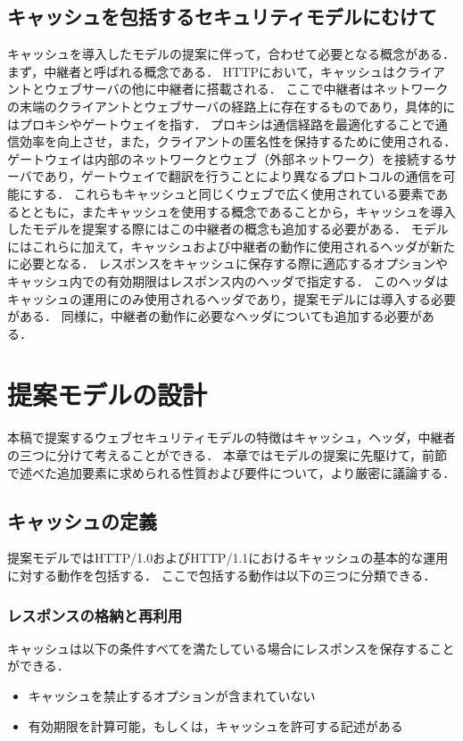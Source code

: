\documentclass{css}
\begin{document}
\subsection{キャッシュを包括するセキュリティモデルにむけて}
キャッシュを導入したモデルの提案に伴って，合わせて必要となる概念がある．
まず，中継者と呼ばれる概念である．
HTTPにおいて，キャッシュはクライアントとウェブサーバの他に中継者に搭載される．
ここで中継者はネットワークの末端のクライアントとウェブサーバの経路上に存在するものであり，具体的にはプロキシやゲートウェイを指す．
プロキシは通信経路を最適化することで通信効率を向上させ，また，クライアントの匿名性を保持するために使用される．
ゲートウェイは内部のネットワークとウェブ（外部ネットワーク）を接続するサーバであり，ゲートウェイで翻訳を行うことにより異なるプロトコルの通信を可能にする．
これらもキャッシュと同じくウェブで広く使用されている要素であるとともに，またキャッシュを使用する概念であることから，キャッシュを導入したモデルを提案する際にはこの中継者の概念も追加する必要がある．
モデルにはこれらに加えて，キャッシュおよび中継者の動作に使用されるヘッダが新たに必要となる．
レスポンスをキャッシュに保存する際に適応するオプションやキャッシュ内での有効期限はレスポンス内のヘッダで指定する．
このヘッダはキャッシュの運用にのみ使用されるヘッダであり，提案モデルには導入する必要がある．
同様に，中継者の動作に必要なヘッダについても追加する必要がある．

\section{提案モデルの設計}
\label{sec:proposed}
本稿で提案するウェブセキュリティモデルの特徴はキャッシュ，ヘッダ，中継者の三つに分けて考えることができる．
本章ではモデルの提案に先駆けて，前節で述べた追加要素に求められる性質および要件について，より厳密に議論する．

\subsection{キャッシュの定義}
\label{cache}
提案モデルではHTTP/1.0およびHTTP/1.1におけるキャッシュの基本的な運用に対する動作を包括する．
ここで包括する動作は以下の三つに分類できる．

\subsubsection{レスポンスの格納と再利用}
\label{sec:store_reuse}
キャッシュは以下の条件すべてを満たしている場合にレスポンスを保存することができる．
\begin{itemize}
\item キャッシュを禁止するオプションが含まれていない
\item 有効期限を計算可能，もしくは，キャッシュを許可する記述がある
\end{itemize}
\end{document}
